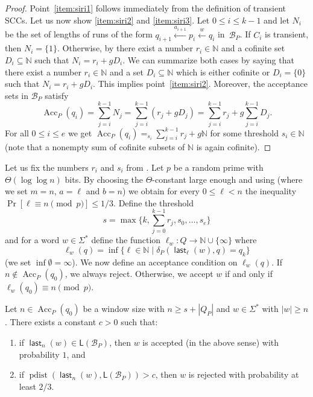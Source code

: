 \documentclass{theoretics}
\newcommand{\N}{\mathbb{N}}
\newcommand{\B}{\mathcal{B}}
\renewcommand{\L}{\mathsf{L}}
\DeclareMathOperator{\last}{\mathsf{last}}
\DeclareMathOperator{\pdist}{pdist}
\DeclareMathOperator{\Acc}{Acc}
\renewcommand{\geq}{\geqslant}
\renewcommand{\leq}{\leqslant}
\renewcommand{\ge}{\geq}
\renewcommand{\le}{\leq}
\begin{document}
\begin{proof}
Point~\ref{item:siri1} follows immediately from the definition of transient SCCs.
Let us now show \ref{item:siri2} and \ref{item:siri3}.
Let $0 \le i \le k-1$ and let $N_i$ be the set of lengths of runs of the form $q_{i+1} \xleftarrow{a_{i+1}} p_i \xleftarrow{w} q_i$ in~$\B_P$.
If $C_i$ is transient, then $N_i = \{1\}$.
Otherwise, by  there exist a number $r_i \in \N$ and a cofinite set $D_i \subseteq \N$ such that $N_i = r_i + gD_i$.
We can summarize both cases by saying that there exist a number $r_i \in \N$
and a set $D_i \subseteq \N$
which is either cofinite or $D_i = \{0\}$ such that $N_i = r_i + gD_i$.
This implies point~\ref{item:siri2}.
Moreover, the acceptance sets in $\B_P$ satisfy
\[
	\Acc_P(q_i) = \sum_{j=i}^{k-1} N_j = \sum_{j=i}^{k-1} (r_j + gD_j) = \sum_{j=i}^{k-1} r_j + g \sum_{j=i}^{k-1} D_j.
\]
For all $0 \le i \le e$ we get $\Acc_P(q_i) =_{s_i} \sum_{j=i}^{k-1} r_j + g \N$ for some threshold $s_i \in \N$ (note that a nonempty sum of cofinite subsets of $\N$ is again cofinite).
\end{proof}

Let us fix the numbers $r_i$ and $s_i$ from .
Let $p$ be a random prime with $\Theta(\log \log n)$ bits. By choosing the $\Theta$-constant
large enough and using   (where we set $m = n$, $a = \ell$ and $b = n$) we
obtain for every $0 \le \ell < n$ the inequality
$\Pr[\ell \equiv n \pmod p] \le 1/3$.
Define the threshold 
\[ 
s = \max\{k, \sum_{j=0}^{k-1} r_j, s_0, \dots, s_e \}
\]
and for a word $w \in \Sigma^*$ define the function
$\ell_w \colon Q \to \N \cup \{\infty\}$ where
\[
	\ell_w(q) = \inf \{ \ell \in \N \mid \delta_P(\last_\ell(w),q) = q_k  \}
\]
(we set $\inf \emptyset = \infty$).
We now define an acceptance condition on $\ell_w(q)$.
If $n \notin \Acc_P(q_0)$, we always reject.
Otherwise, we accept $w$ if and only if $\ell_w(q_0) \equiv n \pmod p$.

\begin{lemma}
\label{lm:acceptingconditiononesided}
Let $n \in \Acc_P(q_0)$ be a window size with $n \ge s + |Q_P|$ and $w \in \Sigma^*$ with $|w| \ge n$.
There exists a constant $c > 0$ such that:
\begin{enumerate}[label=(\roman{*}), ref=(\roman{*})]
\item if $\last_n(w) \in \L(\B_P)$, then $w$ is accepted (in the above sense) with probability $1$, and
\item if $\pdist(\last_n(w), \L(\B_P)) > c$, then $w$ is rejected with probability at least $2/3$.
\end{enumerate}
\end{lemma}
\end{document}
